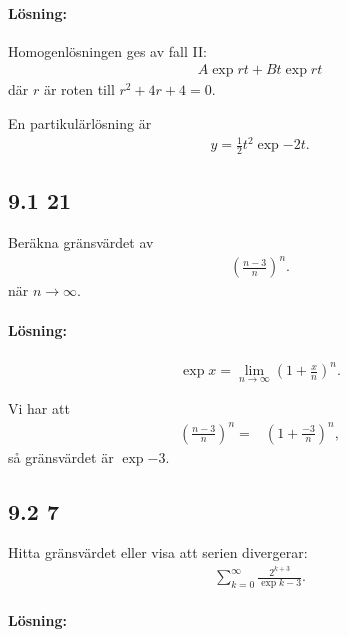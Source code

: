 \paragraph{Lösning:}

Homogenlösningen ges av fall II:
\begin{align*}
	A \exp{r t} + B t \exp{r t}
\end{align*}
där $r$ är roten till $r^2 + 4 r + 4 = 0$.

En partikulärlösning är
\begin{align*}
	y = \frac{1}{2} t^2 \exp{-2 t}.
\end{align*}


\subsection{9.1 21}%
\label{sub:9_1_21}

Beräkna gränsvärdet av
\begin{align*}
	\left( \frac{n - 3}{n} \right)^n.
\end{align*}
när $n \to \infty$.

\paragraph{Lösning:}

\begin{theorem}
	\begin{align*}
		\exp{x} = \lim_{n \to \infty} \left( 1 + \frac{x}{n} \right)^n.
	\end{align*}
\end{theorem}

Vi har att
\begin{align*}
	\left( \frac{n - 3}{n} \right)^n ={}& \left( 1 + \frac{-3}{n} \right)^n,
\end{align*}
så gränsvärdet är $\exp{-3}$.


\subsection{9.2 7}%
\label{sub:9_2_7}

Hitta gränsvärdet eller visa att serien divergerar:
\begin{align*}
	\sum_{k = 0}^\infty \frac{2^{k + 3}}{\exp{k - 3}}.
\end{align*}

\paragraph{Lösning:}

